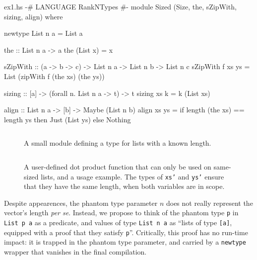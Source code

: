 \documentclass[format=sigplan, review=false, screen=true]{acmart}
\begin{document}
\begin{filecontents*}{ex1.hs}  
{-# LANGUAGE RankNTypes #-}
module Sized (Size, the, sZipWith, sizing, align) where

newtype List n a = List a

the :: List n a -> a
the (List x) = x

sZipWith ::
  (a -> b -> c) -> List n a -> List n b -> List n c
sZipWith f xs ys = List (zipWith f (the xs) (the ys))
  
sizing :: [a] -> (forall n. List n a -> t) -> t
sizing xs k = k (List xs)

align :: List n a -> [b] -> Maybe (List n b)
align xs ys = if length (the xs) == length ys
              then Just (List ys)
              else Nothing
\end{filecontents*}


\begin{figure}
    \inputminted{haskell}{ex1.hs}
  \caption{A small module defining a type for lists with a known length. \label{sizing}}
\end{figure}
\begin{figure}
    \inputminted{haskell}{ex2.hs}
    \caption{A user-defined dot product function that can only be used on same-sized lists,
      and a usage example. The types of \texttt{xs'} and \texttt{ys'} ensure that they have
      the same length, when both variables are in scope.\label{dot-product}}
\end{figure}

Despite  appearences, the phantom type parameter $n$ does not really represent the vector's length
{\em per se}. Instead, we propose to think of the phantom type \texttt{p} in \texttt{List p a} as a predicate,
and values of type \texttt{List n a} as ``lists of type \texttt{[a]}, equipped with a proof
that they satisfy \texttt{p}''. Critically, this proof has no run-time impact: it is trapped in the
phantom type parameter, and carried by a \texttt{newtype} wrapper that vanishes in
the final compilation.
\end{document}
